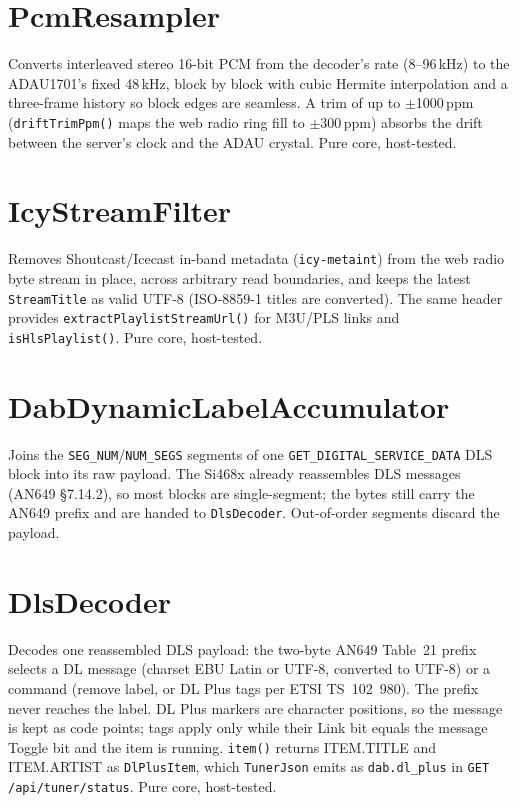 \section{PcmResampler}\label{cls:PcmResampler}
Converts interleaved stereo 16-bit PCM from the decoder's rate (8--96\,kHz)
to the ADAU1701's fixed 48\,kHz, block by block with cubic Hermite
interpolation and a three-frame history so block edges are seamless. A
trim of up to $\pm$1000\,ppm (\texttt{driftTrimPpm()} maps the web radio
ring fill to $\pm$300\,ppm) absorbs the drift between the server's clock
and the ADAU crystal. Pure core, host-tested.

\section{IcyStreamFilter}\label{cls:IcyStreamFilter}
Removes Shoutcast/Icecast in-band metadata (\texttt{icy-metaint}) from the
web radio byte stream in place, across arbitrary read boundaries, and keeps
the latest \texttt{StreamTitle} as valid UTF-8 (ISO-8859-1 titles are
converted). The same header provides \texttt{extractPlaylistStreamUrl()}
for M3U/PLS links and \texttt{isHlsPlaylist()}. Pure core, host-tested.

\section{DabDynamicLabelAccumulator}\label{cls:DabDynamicLabelAccumulator}
Joins the \texttt{SEG\_NUM}/\texttt{NUM\_SEGS} segments of one
\texttt{GET\_DIGITAL\_SERVICE\_DATA} DLS block into its raw payload. The
Si468x already reassembles DLS messages (AN649 \S7.14.2), so most blocks
are single-segment; the bytes still carry the AN649 prefix and are handed
to \texttt{DlsDecoder}. Out-of-order segments discard the payload.

\section{DlsDecoder}\label{cls:DlsDecoder}
Decodes one reassembled DLS payload: the two-byte AN649 Table~21 prefix
selects a DL message (charset EBU Latin or UTF-8, converted to UTF-8) or
a command (remove label, or DL Plus tags per ETSI TS~102~980). The prefix
never reaches the label. DL Plus markers are character positions, so the
message is kept as code points; tags apply only while their Link bit
equals the message Toggle bit and the item is running. \texttt{item()}
returns ITEM.TITLE and ITEM.ARTIST as \texttt{DlPlusItem}, which
\texttt{TunerJson} emits as \texttt{dab.dl\_plus} in
\texttt{GET /api/tuner/status}. Pure core, host-tested.

